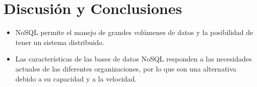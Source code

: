 \documentclass[%
 reprint,
 amsmath,amssymb,
 aps,
]{revtex4-1}
\begin{document}
\section{Discusión y Conclusiones}\label{sec:5}
	\begin{itemize}
		\item NoSQL permite el manejo de grandes volúmenes de datos y la posibilidad de tener un sistema distribuido.
		\item Las características de las bases de datos NoSQL responden a las necesidades actuales de las diferentes organizaciones, por lo que son una alternativa debido a su capacidad y a la velocidad.
	\end{itemize}





\end{document}
